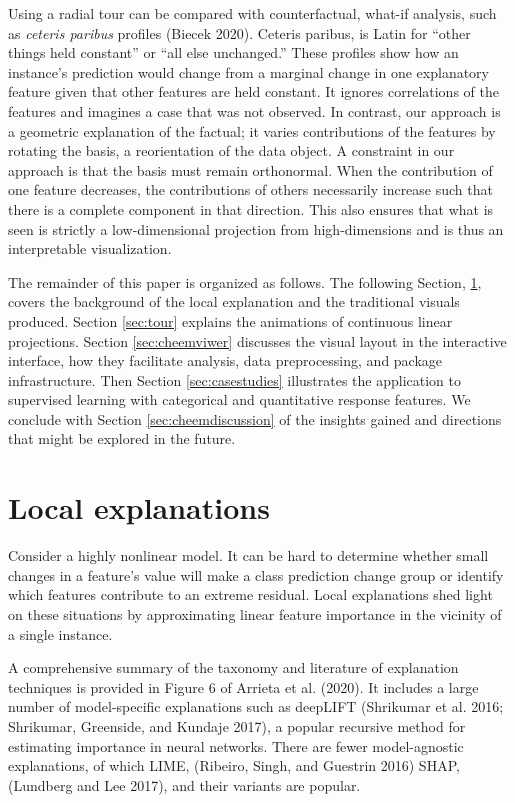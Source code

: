 \documentclass[
]{article}
\begin{document}
Using a radial tour can be compared with counterfactual, what-if analysis, such as \emph{ceteris paribus} profiles (Biecek 2020). Ceteris paribus, is Latin for ``other things held constant'' or ``all else unchanged.'' These profiles show how an instance's prediction would change from a marginal change in one explanatory feature given that other features are held constant. It ignores correlations of the features and imagines a case that was not observed. In contrast, our approach is a geometric explanation of the factual; it varies contributions of the features by rotating the basis, a reorientation of the data object. A constraint in our approach is that the basis must remain orthonormal. When the contribution of one feature decreases, the contributions of others necessarily increase such that there is a complete component in that direction. This also ensures that what is seen is strictly a low-dimensional projection from high-dimensions and is thus an interpretable visualization.

The remainder of this paper is organized as follows. The following Section, \ref{sec:explanations}, covers the background of the local explanation and the traditional visuals produced. Section \ref{sec:tour} explains the animations of continuous linear projections. Section \ref{sec:cheemviwer} discusses the visual layout in the interactive interface, how they facilitate analysis, data preprocessing, and package infrastructure. Then Section \ref{sec:casestudies} illustrates the application to supervised learning with categorical and quantitative response features. We conclude with Section \ref{sec:cheemdiscussion} of the insights gained and directions that might be explored in the future.

\hypertarget{sec:explanations}{%
\section{Local explanations}\label{sec:explanations}}

Consider a highly nonlinear model. It can be hard to determine whether small changes in a feature's value will make a class prediction change group or identify which features contribute to an extreme residual. Local explanations shed light on these situations by approximating linear feature importance in the vicinity of a single instance.

A comprehensive summary of the taxonomy and literature of explanation techniques is provided in Figure 6 of Arrieta et al. (2020). It includes a large number of model-specific explanations such as deepLIFT (Shrikumar et al. 2016; Shrikumar, Greenside, and Kundaje 2017), a popular recursive method for estimating importance in neural networks. There are fewer model-agnostic explanations, of which LIME, (Ribeiro, Singh, and Guestrin 2016) SHAP, (Lundberg and Lee 2017), and their variants are popular.
\end{document}
